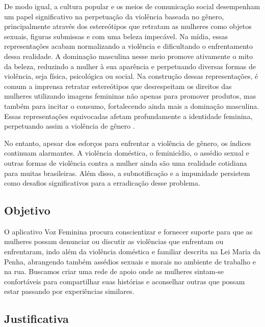 \documentclass[
    article,			%
    12pt,				%
    oneside,            %
    a4paper,			%
    english,			%
    brazil,				%
    ]{abntex2}
\begin{document}
    De modo igual, a cultura popular e os meios de comunicação social desempenham um papel significativo na perpetuação da violência baseada no gênero, principalmente através dos estereótipos que retratam as mulheres como objetos sexuais, figuras submissas e com uma beleza impecável. Na mídia, essas representações acabam normalizando a violência e dificultando o enfrentamento dessa realidade. A dominação masculina nesse meio promove ativamente o mito da beleza, reduzindo a mulher à sua aparência e perpetuando diversas formas de violência, seja física, psicológica ou social. Na construção dessas representações, é comum a imprensa retratar estereótipos que desrespeitam os direitos das mulheres utilizando imagens femininas não apenas para promover produtos, mas também para incitar o consumo, fortalecendo ainda mais a dominação masculina. Essas representações equivocadas afetam profundamente a identidade feminina, perpetuando assim a violência de gênero \cite{mulhermidia_2018}.

    No entanto, apesar dos esforços para enfrentar a violência de gênero, os índices continuam alarmantes. A violência doméstica, o feminicídio, o assédio sexual e outras formas de violência contra a mulher ainda são uma realidade cotidiana para muitas brasileiras. Além disso, a subnotificação e a impunidade persistem como desafios significativos para a erradicação desse problema.

\subsection{Objetivo}

    O aplicativo Voz Feminina procura conscientizar e fornecer suporte para que as mulheres possam denunciar ou discutir as violências que enfrentam ou enfrentaram, indo além da violência doméstica e familiar descrita na Lei Maria da Penha, abrangendo também assédios sexuais e morais no ambiente de trabalho e na rua. Buscamos criar uma rede de apoio onde as mulheres sintam-se confortáveis para compartilhar suas histórias e aconselhar outras que possam estar passando por experiências similares.

\subsection{Justificativa}
\end{document}
